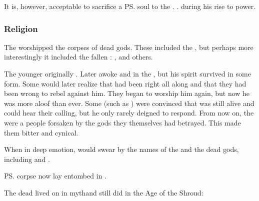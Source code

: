 It is, however, acceptable to sacrifice a \ps{\dragon} soul to the \xss. 
\TyarithXserasshana{} . 
\IrocasSecherdamon{}  during his rise to power. 









\subsubsection{Religion}
The \dragons{} worshipped the corpses of dead gods. 
These included the , but perhaps more interestingly it included the fallen \firstgendragons: 
\Sethicus, \Xserasshana and others. 

The younger \dragons originally . 
Later \Sethicus awoke and  in the \firstbanewar, but his spirit survived in some form. 
Some \dragons would later realize that \Sethicus had been right all along and that they had been wrong to rebel against him. 
They began to worship him again, but now he was more aloof than ever. 
Some \dragons (such as \Ishnaruchaefir) were convinced that \Sethicus was still alive and could hear their calling, but he only rarely deigned to respond. 
From now on, the \dragons were a people forsaken by the gods they themselves had betrayed.
This made them bitter and cynical. 

When in deep emotion, \dragons would swear by the names of the \xss and the dead gods, including \Sethicus and \Tiamat. 

\ps{\Xserasshana} corpse now lay entombed in . 

The dead \dragons lived on in myth\dash and still did in the Age of the Shroud:


